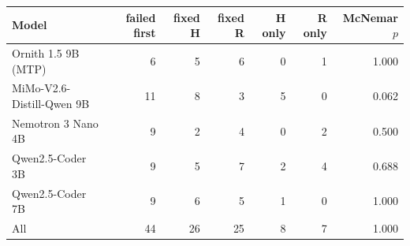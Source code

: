 \begin{tabular}{lrrrrrr}\toprule Model & failed first & fixed H & fixed R & H only & R only & McNemar $p$\\\midrule
Ornith 1.5 9B (MTP) & 6 & 5 & 6 & 0 & 1 & 1.000 \\
MiMo-V2.6-Distill-Qwen 9B & 11 & 8 & 3 & 5 & 0 & 0.062 \\
Nemotron 3 Nano 4B & 9 & 2 & 4 & 0 & 2 & 0.500 \\
Qwen2.5-Coder 3B & 9 & 5 & 7 & 2 & 4 & 0.688 \\
Qwen2.5-Coder 7B & 9 & 6 & 5 & 1 & 0 & 1.000 \\
\midrule All & 44 & 26 & 25 & 8 & 7 & 1.000 \\
\bottomrule\end{tabular}
